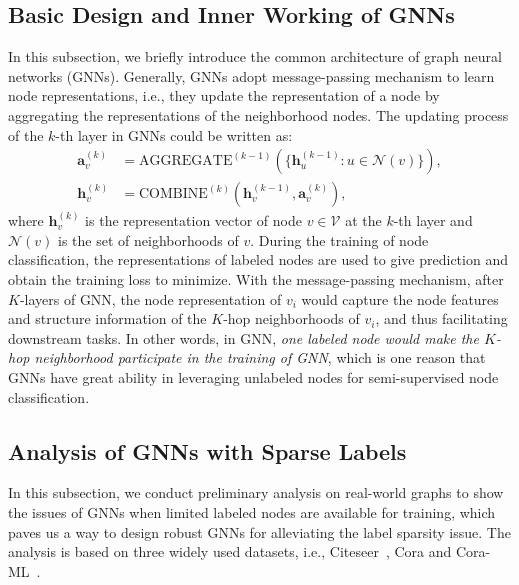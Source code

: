 \subsection{Basic Design and Inner Working of GNNs}
In this subsection, we briefly introduce the common architecture of graph neural networks (GNNs). 
Generally, GNNs adopt message-passing mechanism to learn node representations, i.e., they update the representation of a node by aggregating the representations of the neighborhood nodes. The updating process of the $k$-th layer in GNNs could be written as:
\begin{equation}
\begin{aligned}
    \mathbf{a}^{(k)}_v & = \text{AGGREGATE}^{(k-1)}(\{\mathbf{h}^{(k-1)}_u: u \in \mathcal{N}(v)\}),
    \label{eq:GNN_a} \\
    \mathbf{h}^{(k)}_{v} & =\text{COMBINE}^{(k)}(\mathbf{h}^{(k-1)}_v, \mathbf{a}_v^{(k)}),
\end{aligned}
\end{equation}
where $\mathbf{h}^{(k)}_v$ is the representation vector of node $v \in \mathcal{V}$ at the $k$-th layer and $\mathcal{N}(v)$ is the set of neighborhoods of $v$. 
During the training of node classification, the representations of labeled nodes are used to give prediction and obtain the training loss to minimize.
With the message-passing mechanism, after $K$-layers of GNN, the node representation of $v_i$ would capture the node features and structure information of the $K$-hop neighborhoods of $v_i$, and thus facilitating downstream tasks. 
In other words, in GNN, \textit{one labeled node would make the $K$-hop neighborhood participate in the training of GNN}, which is one reason that GNNs have great ability in leveraging unlabeled nodes for semi-supervised node classification. 

\subsection{Analysis of GNNs with Sparse Labels}

In this subsection, we conduct preliminary analysis on real-world graphs to show the issues of GNNs when limited labeled nodes are available for training, which paves us a way to design robust GNNs for alleviating the label sparsity issue. The analysis is based on three widely used datasets, i.e., Citeseer~\cite{sen2008collective}, Cora and Cora-ML~\cite{mccallum2000automating}.

